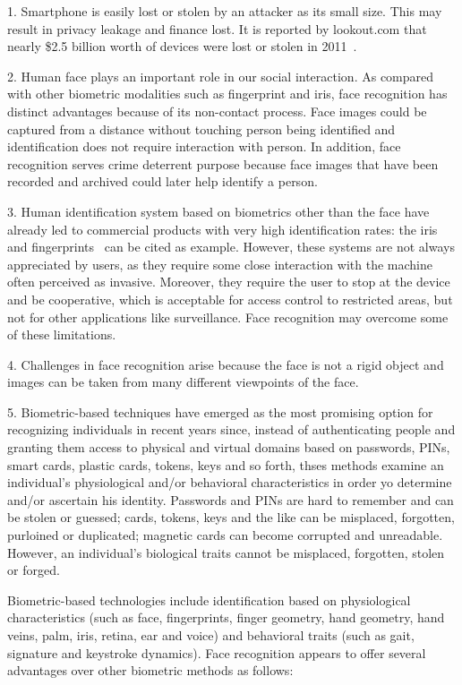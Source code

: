 1. Smartphone is easily lost or stolen by an attacker as its small size. This may result in privacy leakage and finance lost. It is reported by lookout.com that nearly \$2.5 billion worth of devices were lost or stolen in 2011~\cite{lookout-survey}.

2. Human face plays an important role in our social interaction. As compared with other biometric modalities such as fingerprint and iris, face recognition has distinct advantages because of its non-contact process. Face images could be captured from a distance without touching person being identified and identification does not require interaction with person. In addition, face recognition serves crime deterrent purpose because face images that have been recorded and archived could later help identify a person.

3. Human identification system based on biometrics other than the face have already led to commercial products with very high identification rates: the iris~\cite{daugman1993high} and fingerprints~\cite{rogers1994biometric} can be cited as example. However, these systems are not always appreciated by users, as they require some close interaction with the machine often perceived as invasive. Moreover, they require the user to stop at the device and be cooperative, which is acceptable for access control to restricted areas, but not for other applications like surveillance. Face recognition may overcome some of these limitations.

4. Challenges in face recognition arise because the face is not a rigid object and images can be taken from many different viewpoints of the face.

5. Biometric-based techniques have emerged as the most promising option for recognizing individuals in recent years since, instead of authenticating people and granting them access to physical and virtual domains based on passwords, PINs, smart cards, plastic cards, tokens, keys and so forth, thses methods examine an individual's physiological and/or behavioral characteristics in order yo determine and/or ascertain his identity. Passwords and PINs are hard to remember and can be stolen or guessed; cards, tokens, keys and the like can be misplaced, forgotten, purloined or duplicated; magnetic cards can become corrupted and unreadable. However, an individual's biological traits cannot be misplaced, forgotten, stolen or forged.

Biometric-based technologies include identification based on physiological characteristics (such as face, fingerprints, finger geometry, hand geometry, hand veins, palm, iris, retina, ear and voice) and behavioral traits (such as gait, signature and keystroke dynamics). Face recognition appears to offer several advantages over other biometric methods as follows:

